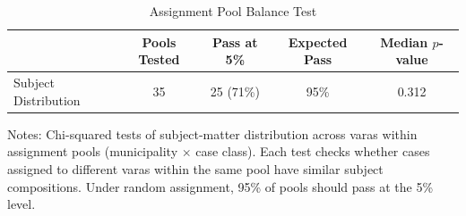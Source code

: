 \begin{table}[t]
\centering
\caption{Assignment Pool Balance Test}
\label{tab:balance}
\begin{tabular}{lcccc}
\hline\hline
 & Pools Tested & Pass at 5\% & Expected Pass & Median $p$-value \\
\hline
Subject Distribution & 35 & 25 (71\%) & 95\% & 0.312 \\
\hline
\end{tabular}
\begin{flushleft}\small
Notes: Chi-squared tests of subject-matter distribution across varas within assignment pools (municipality $\times$ case class). Each test checks whether cases assigned to different varas within the same pool have similar subject compositions. Under random assignment, 95\% of pools should pass at the 5\% level.
\end{flushleft}
\end{table}
